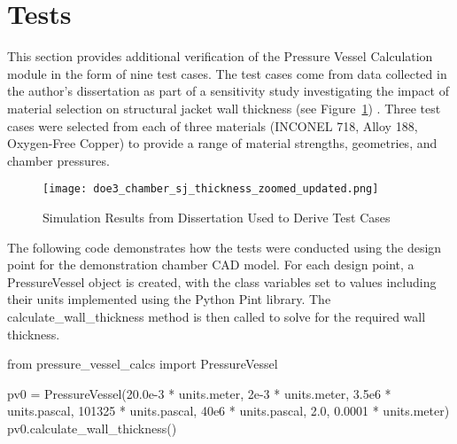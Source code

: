 \documentclass{article}
\begin{document}
\section{Tests}
This section provides additional verification of the Pressure Vessel Calculation module in the form of nine test cases.  The test cases come from data collected in the author's dissertation as part of a sensitivity study investigating the impact of material selection on structural jacket wall thickness (see Figure~\ref{f:doe3_thickness_plot}) \cite{Simmons2014}.  Three test cases were selected from each of three materials (INCONEL 718, Alloy 188, Oxygen-Free Copper) to provide a range of material strengths, geometries, and chamber pressures.

\begin{figure}[!ht]
  \begin{center}
  \texttt{[image: doe3\_chamber\_sj\_thickness\_zoomed\_updated.png]} 
  \caption{Simulation Results from Dissertation Used to Derive Test Cases \cite{Simmons2014}}
  \label{f:doe3_thickness_plot}
  \end{center}
\end{figure}

The following code demonstrates how the tests were conducted using the design point for the demonstration chamber CAD model.  For each design point, a PressureVessel object is created, with the class variables set to values including their units implemented using the Python Pint library.  The calculate\_wall\_thickness method is then called to solve for the required wall thickness.

\begin{sageblock}
from pressure_vessel_calcs import PressureVessel

pv0 = PressureVessel(20.0e-3 * units.meter,
                     2e-3 * units.meter,
                     3.5e6 * units.pascal,
                     101325 * units.pascal,
                     40e6 * units.pascal,
                     2.0,
                     0.0001 * units.meter)
pv0.calculate_wall_thickness()
\end{sageblock}
\end{document}
